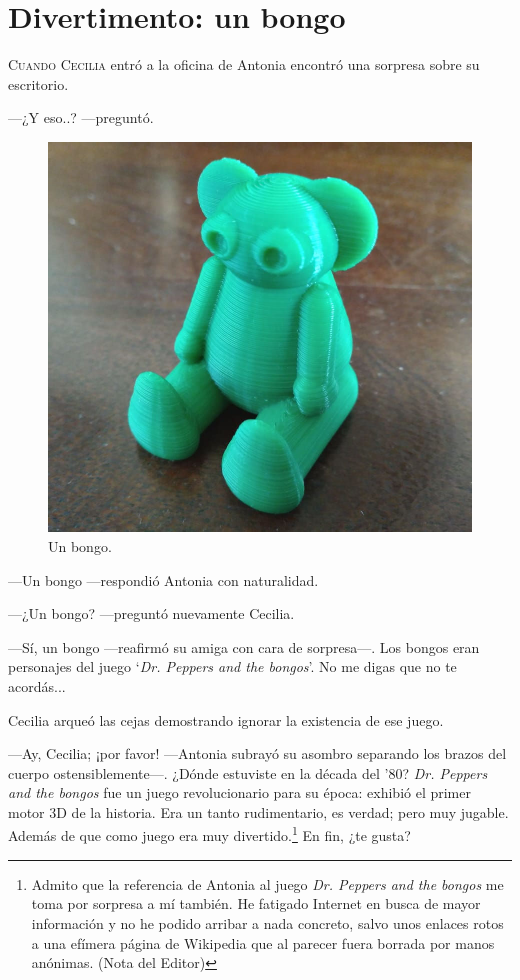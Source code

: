 
\chapter{Divertimento: un bongo}

\lettrine[lines=2]{C}{uando Cecilia} entró a la oficina de Antonia
encontró una sorpresa sobre su escritorio.

---¿Y eso..?  ---preguntó.

\begin{figure}[ht]
  \centering
  \includegraphics[width=.65\textwidth]{imagenes/bongo2}
  \caption{Un bongo.}
  \label{fig:bongo2}
\end{figure}
  


---Un bongo ---respondió Antonia con naturalidad.

---¿Un bongo? ---preguntó nuevamente Cecilia.

---Sí, un bongo ---reafirmó su amiga con cara de sor\-pre\-sa---. Los
bongos eran personajes del juego `\emph{Dr. Peppers and the
  bongos}'. No me digas que no te acordás...

Cecilia arqueó las cejas demostrando ignorar la existencia de ese
juego.

---Ay, Cecilia; ¡por favor! ---Antonia subrayó su asombro separando
los brazos del cuerpo ostensiblemente---. ¿Dónde estuviste en la
década del '80? \emph{Dr. Peppers and the bongos} fue un juego
revolucionario para su época: exhibió el primer motor 3D de la
historia. Era un tanto rudimentario, es verdad; pero muy
jugable. Además de que como juego era muy divertido.\footnote{Admito
  que la referencia de Antonia al juego \emph{Dr. Peppers and the
    bongos} me toma por sorpresa a mí también. He fatigado Internet en
  busca de mayor información y no he podido arribar a nada concreto,
  salvo unos enlaces rotos a una efímera página de Wikipedia que al
  parecer fuera borrada por manos anónimas. (Nota del Editor)} En fin,
¿te gusta?

